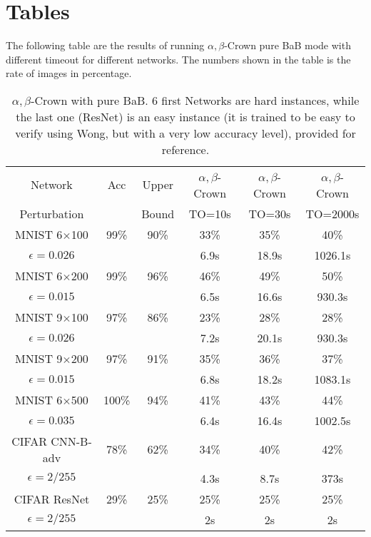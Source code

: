 \section*{Tables}

The following table are the results of running $\alpha,\beta$-Crown pure BaB mode with different timeout for different networks. The numbers shown in the table is the rate of images in percentage.

\begin{table}
	\centering
	\begin{tabular}{||c|c|c||c|c|c||}
		\hline
		Network & Acc & Upper  & $\alpha,\beta$-Crown& $\alpha,\beta$-Crown & $\alpha,\beta$-Crown \\ 
		Perturbation &   & Bound & TO=10s & TO=30s & TO=2000s\\ \hline
		MNIST 6$\times$100 & 99\% & 90\% & 33\% & 35\% & 40\%   \\
		$\epsilon = 0.026$ &  &  & 6.9s &  18.9s &  1026.1s  \\  \hline
		MNIST 6$\times$200 & 99\%  & 96\%  & 46\%  & 49\%  & 50\%   \\ 
		$\epsilon = 0.015$ & &  & 6.5s &  16.6s &  930.3s  \\  \hline
		MNIST 9$\times$100 & 97\%  & 86\%  & 23\%  & 28\%  & 28\%   \\
		$\epsilon = 0.026$ &  &  & 7.2s &  20.1s &  930.3s  \\  \hline
		MNIST 9$\times$200 & 97\%  & 91\%  & 35\%  & 36\%  & 37\%   \\ 
		$\epsilon = 0.015$ & &  & 6.8s &  18.2s &  1083.1s  \\  \hline
		MNIST 6$\times$500 & 100\%  & 94\%  & 41\%  & 43\%  & 44\%   \\ 
		$\epsilon = 0.035$ & &  & 6.4s &  16.4s &  1002.5s  \\  \hline
		CIFAR CNN-B-adv & 78\%  & 62\%  &  34\% & 40\%  & 42\%   \\
		$\epsilon = 2/255$&  &  & 4.3s & 8.7s & 373s  \\ \hline \hline
		CIFAR ResNet & 29\%  & 25\%  & 25\%  & 25\%  & 25\%   \\
		$\epsilon = 2/255$ &  &  & 2s & 2s & 2s  \\ \hline
	\end{tabular}
	\caption{$\alpha,\beta$-Crown with pure BaB. 6 first Networks are hard instances, while the last one (ResNet) is an easy instance (it is trained to be easy to verify using Wong, but with a very low accuracy level), provided for reference.}
	\label{table_beta}
\end{table}


